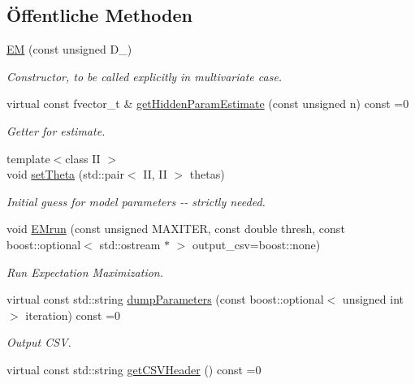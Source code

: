 \subsection*{Öffentliche Methoden}
\begin{DoxyCompactItemize}
\item 
\hypertarget{classCDA_1_1EM_ad18a674dbf206303ba61571d5b385732}{
\hyperlink{classCDA_1_1EM_ad18a674dbf206303ba61571d5b385732}{EM} (const unsigned D\_)}
\label{classCDA_1_1EM_ad18a674dbf206303ba61571d5b385732}

\begin{DoxyCompactList}\small\item\em Constructor, to be called explicitly in multivariate case. \item\end{DoxyCompactList}\item 
\hypertarget{classCDA_1_1EM_a8fa4fea4987c54f6ae1499492cc9130c}{
virtual const fvector\_\-t \& \hyperlink{classCDA_1_1EM_a8fa4fea4987c54f6ae1499492cc9130c}{getHiddenParamEstimate} (const unsigned n) const =0}
\label{classCDA_1_1EM_a8fa4fea4987c54f6ae1499492cc9130c}

\begin{DoxyCompactList}\small\item\em Getter for estimate. \item\end{DoxyCompactList}\item 
{\footnotesize template$<$class II $>$ }\\void \hyperlink{classCDA_1_1EM_a9e02e070fa25ab5bd9c2badbbd157f13}{setTheta} (std::pair$<$ II, II $>$ thetas)
\begin{DoxyCompactList}\small\item\em Initial guess for model parameters -\/-\/ strictly needed. \item\end{DoxyCompactList}\item 
void \hyperlink{classCDA_1_1EM_a1c8fa9008da1f168f211f48c578dce5f}{EMrun} (const unsigned MAXITER, const double thresh, const boost::optional$<$ std::ostream $\ast$ $>$ output\_\-csv=boost::none)
\begin{DoxyCompactList}\small\item\em Run Expectation Maximization. \item\end{DoxyCompactList}\item 
virtual const std::string \hyperlink{classCDA_1_1EM_ad2655bd878821e73ba18beff576a2b4a}{dumpParameters} (const boost::optional$<$ unsigned int $>$ iteration) const =0
\begin{DoxyCompactList}\small\item\em Output CSV. \item\end{DoxyCompactList}\item 
\hypertarget{classCDA_1_1EM_ad29bbf755c6a32215881efca2d90d6a9}{
virtual const std::string \hyperlink{classCDA_1_1EM_ad29bbf755c6a32215881efca2d90d6a9}{getCSVHeader} () const =0}
\label{classCDA_1_1EM_ad29bbf755c6a32215881efca2d90d6a9}


\end{DoxyCompactItemize}
